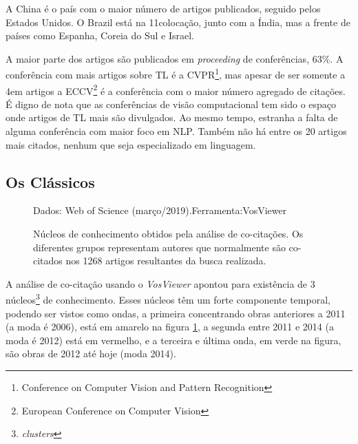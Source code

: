 \documentclass[sigconf]{acmart}
\newcommand{\source}[2]{\raggedleft{}\vspace*{-7mm}\caption*{ \textmd{\scriptsize{Dados: {#1}.\hfill Ferramenta:{#2}}}}}
\begin{document}
  A China é o país com o maior número de artigos publicados, seguido pelos Estados Unidos. O Brazil está na 11\textordfeminine colocação, junto com a Índia, mas a frente de países como Espanha, Coreia do Sul e Israel.

  A maior parte dos artigos são publicados em \emph{proceeding} de conferências, 63\%. A conferência com mais artigos sobre TL é a CVPR\footnote{Conference on Computer Vision and Pattern Recognition}, mas apesar de ser somente a 4\textordfeminine em artigos a ECCV\footnote{European Conference on Computer Vision} é a conferência com o maior número agregado de citações. É digno de nota que as conferências de visão computacional tem sido o espaço onde artigos de TL mais são divulgados. Ao mesmo tempo, estranha a falta de alguma conferência com maior foco em NLP. Também não há entre os 20 artigos mais citados, nenhum que seja especializado em linguagem.
  \subsection{Os Clássicos}\label{classicos}
  \begin{figure}[htp]
    \source{Web of Science (março/2019)}{VosViewer\protect{~\cite{VOSviewer}}}
    \caption{Núcleos de conhecimento obtidos pela análise de co-citações. Os diferentes grupos representam autores que normalmente são co-citados nos 1268 artigos resultantes da busca realizada.}
    \label{fig:classicos}
  \end{figure}

A análise de co-citação usando o \emph{VosViewer} apontou para existência de 3 núcleos\footnote{\emph{clusters}} de conhecimento. Esses núcleos têm um forte componente temporal, podendo ser vistos como ondas, a primeira concentrando obras anteriores a 2011 (a moda é 2006),  está em amarelo na figura \ref{fig:classicos}, a segunda entre 2011 e 2014 (a moda é 2012) está em vermelho, e a terceira e última onda, em verde na figura, são obras de 2012 até hoje (moda 2014).
\end{document}
